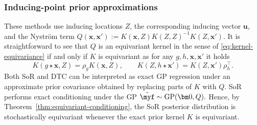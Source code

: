 \documentclass[11pt,a4paper]{article}
\newcommand{\bx}{\boldsymbol{x}}
\newcommand{\by}{\boldsymbol{y}}
\newcommand{\bz}{\boldsymbol{z}}
\begin{document}
\subsubsection{Inducing-point prior approximations} %
\label{subsec:conseq-prior-inducing}
These methods use inducing locations $Z$, the corresponding inducing vector $\boldsymbol{u}$, and the Nyström term $Q(\bx,\bx'):=K(\bx,Z)K(Z,Z)^{-1}K(Z,\bx').$ It is straightforward to see that $Q$ is an equivariant kernel in the sense of \eqref{eq:kernel-equivariance} if and only if $K$ is equivariant as for any $g,h, \bx, \bx'$ it holds \begin{displaymath}K(g\star \bx,Z)=\rho_gK(\bx,Z), \qquad K(Z,h\star \bx')=K(Z,\bx')\rho_h^\top.\end{displaymath}
Both SoR and DTC can be interpreted as exact GP regression under an approximate prior covariance obtained by replacing parts of $K$ with $Q$.
SoR performs exact conditioning under the GP $\tilde{\myf}\sim\mathrm{GP}(\bm 0,Q).$ %
Hence, by Theorem~\ref{thm:equivariant-conditioning}, the SoR posterior distribution is stochastically equivariant whenever the
exact prior kernel $K$ is equivariant.  
\end{document}
